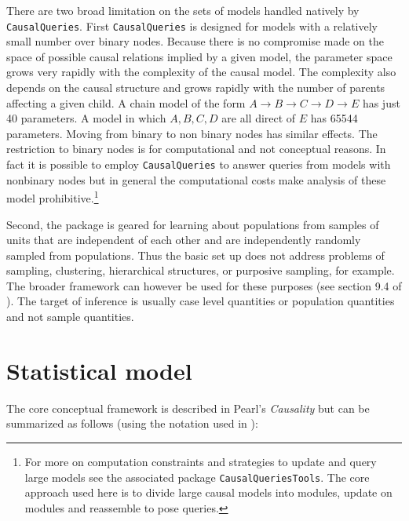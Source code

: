 \documentclass[
  11pt,
  article]{jss}
\begin{document}
There are two broad limitation on the sets of models handled natively by
\texttt{CausalQueries}. First \texttt{CausalQueries} is designed for
models with a relatively small number over binary nodes. Because there
is no compromise made on the space of possible causal relations implied
by a given model, the parameter space grows very rapidly with the
complexity of the causal model. The complexity also depends on the
causal structure and grows rapidly with the number of parents affecting
a given child. A chain model of the form
\(A \rightarrow B \rightarrow C \rightarrow D \rightarrow E\) has just
40 parameters. A model in which \(A, B, C, D\) are all direct of \(E\)
has 65544 parameters. Moving from binary to non binary nodes has similar
effects. The restriction to binary nodes is for computational and not
conceptual reasons. In fact it is possible to employ
\texttt{CausalQueries} to answer queries from models with nonbinary
nodes but in general the computational costs make analysis of these
model prohibitive.\footnote{For more on computation constraints and
  strategies to update and query large models see the associated package
  \texttt{CausalQueriesTools}. The core approach used here is to divide
  large causal models into modules, update on modules and reassemble to
  pose queries.}

Second, the package is geared for learning about populations from
samples of units that are independent of each other and are
independently randomly sampled from populations. Thus the basic set up
does not address problems of sampling, clustering, hierarchical
structures, or purposive sampling, for example. The broader framework
can however be used for these purposes (see section 9.4 of
\citet{ii2023}). The target of inference is usually case level
quantities or population quantities and not sample quantities.

\hypertarget{sec-theory}{%
\section{Statistical model}\label{sec-theory}}

The core conceptual framework is described in Pearl's \emph{Causality}
\citep{pearl2009causality} but can be summarized as follows (using the
notation used in \citet{ii2023}):
\end{document}
